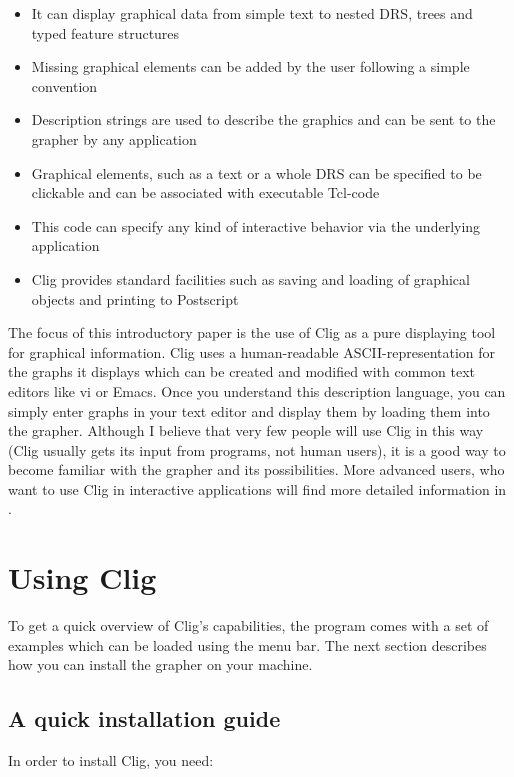 \begin{itemize}
\item It can display graphical data from simple text to nested
DRS, trees and typed feature structures
\item Missing graphical elements can be added by the user following
a simple convention
\item Description strings are used to describe the graphics and can
be sent to the grapher by any application
\item Graphical elements, such as a text or a whole DRS can be
specified to be clickable and can be associated with executable
Tcl-code
\item This code can specify any kind of interactive behavior via the
underlying application
\item {\sc Clig} provides standard facilities such as saving and loading
of graphical objects and printing to Postscript
\end{itemize}

The focus of this introductory paper is the use of {\sc Clig} as a
pure displaying tool for graphical information. {\sc Clig} uses a
human-readable ASCII-representation for the graphs it displays which
can be created and modified with common text editors like {\sc vi} or
{\sc Emacs}. Once you understand this description language, you can
simply enter graphs in your text editor and display them by loading
them into the grapher. Although I believe that very few people will use
{\sc Clig} in this way ({\sc Clig} usually gets its input from
programs, not human users), it is a good way to become familiar with
the grapher and its possibilities. More advanced users, who want to use
{\sf Clig} in interactive applications will find more detailed
information in \cite{Konrad 95b}.

\section{Using {\sc Clig}}

To get a quick overview of {\sc Clig}'s capabilities, the program comes
with a set of examples which can be loaded using the menu bar. The next
section describes how you can install the grapher on your machine.

\subsection{A quick installation guide}

In order to install {\sc Clig}, you need:

